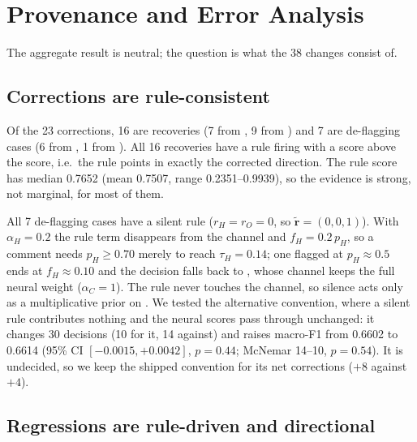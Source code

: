 \section{Provenance and Error Analysis}
\label{sec:analysis}

The aggregate result is neutral; the question is what the 38 changes consist of.

\subsection{Corrections are rule-consistent}
\label{sec:corrections}

Of the 23 corrections, 16 are \hate{} recoveries (7 from \off{}, 9 from \clean{})
and 7 are \clean{} de-flagging cases (6 from \hate{}, 1 from \off{}). All 16 \hate{}
recoveries have a rule firing with a \hate{} score above the \off{} score, i.e.\ the
rule points in exactly the corrected direction. The rule \hate{} score has median
0.7652 (mean 0.7507, range 0.2351--0.9939), so the evidence is strong, not marginal,
for most of them.

All 7 \clean{} de-flagging cases have a silent rule ($r_H=r_O=0$, so
$\tilde{\mathbf r}=(0,0,1)$). With $\alpha_H=0.2$ the rule term disappears from the
\hate{} channel and $f_H=0.2\,p_H$, so a comment needs $p_H\ge0.70$ merely to reach
$\tau_H=0.14$; one flagged \hate{} at $p_H\approx0.5$ ends at $f_H\approx0.10$ and the
decision falls back to \clean{}, whose channel keeps the full neural weight
($\alpha_C=1$). The rule never touches the \clean{} channel, so silence acts only as a
multiplicative prior on \hate{}. We tested the alternative convention, where a silent
rule contributes nothing and the neural scores pass through unchanged: it changes 30
decisions (10 for it, 14 against) and raises macro-F1 from 0.6602 to 0.6614
(95\% CI $[-0.0015,+0.0042]$, $p=0.44$; McNemar 14--10, $p=0.54$). It is undecided,
so we keep the shipped convention for its net corrections ($+8$ against $+4$).

\subsection{Regressions are rule-driven and directional}
\label{sec:regressions}

